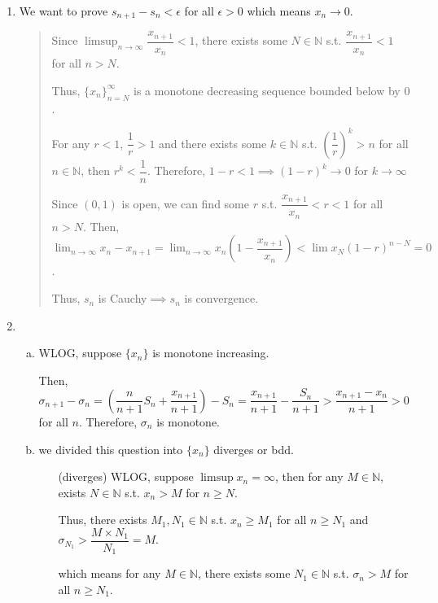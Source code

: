 \documentclass[12pt]{article}
\begin{document}
\begin{enumerate}
    \item We want to prove $s_{n+1} - s_n < \epsilon$ for all $\epsilon > 0$ which means $x_n \to 0$.
    \begin{quote}
        Since $\displaystyle\limsup_{n \to \infty} \dfrac{x_{n+1}}{x_n} < 1$, 
        there exists some $N\in \mathbb{N}$ s.t. $\dfrac{x_{n+1}}{x_n} < 1$ for all $n > N$.

        Thus, $\lbrace x_n\rbrace_{n = N}^\infty$ is a monotone decreasing sequence bounded below by $0$.

        For any $r < 1$, $\dfrac{1}{r} > 1$ and there exists some $k \in \mathbb{N}$ s.t. $(\dfrac{1}{r})^k > n$ for all $n\in \mathbb{N}$,
        then $r^k < \dfrac{1}{n}$. Therefore, $1-r < 1\implies (1-r)^k \to 0$ for $k \to \infty$
        
        Since $(0, 1)$ is open, we can find some $r$ s.t.  $\dfrac{x_{n+1}}{x_n} < r < 1$ for all $n > N$. 
        Then, $\displaystyle\lim_{n \to \infty} x_n - x_{n+1} = \displaystyle\lim_{n\to \infty} x_n(1-\dfrac{x_{n+1}}{x_n}) < \lim x_N (1 - r)^{n-N} = 0$.

        Thus, $s_n$ is Cauchy$\implies s_n$ is convergence.
    \end{quote}

    \newpage
    \item \begin{enumerate}[(a)]
        \item WLOG, suppose $\lbrace x_n \rbrace$ is monotone increasing.
        
        Then, $\sigma_{n+1} - \sigma_n = (\dfrac{n}{n+1} S_n + \dfrac{x_{n+1}}{n+1}) - S_n = \dfrac{x_{n+1}}{n+1} - \dfrac{S_n}{n+1} > \dfrac{x_{n+1}-x_n}{n+1} > 0$ for all $n$.
        Therefore, $\sigma_n$ is monotone.

        \item we divided this question into $\lbrace x_n\rbrace$ diverges or bdd.
        
        \begin{enumerate}
            \item[(diverges)] WLOG, suppose $\limsup x_n = \infty$, then for any $M\in \mathbb{N}$, exists $N \in \mathbb{N}$ s.t. $x_n > M$ for $n \geq N$.
            
            Thus, there exists $M_1, N_1 \in \mathbb{N}$ s.t. $x_n \geq M_1$ for all $n \geq N_1$ and $\sigma_{N_1} > \dfrac{M\times N_1}{N_1} = M$.

            which means for any $M \in \mathbb{N}$, there exists some $N_1 \in \mathbb{N}$ s.t. $\sigma_n > M$ for all $n \geq N_1$.


\end{enumerate}
\end{enumerate}
\end{enumerate}
\end{document}
